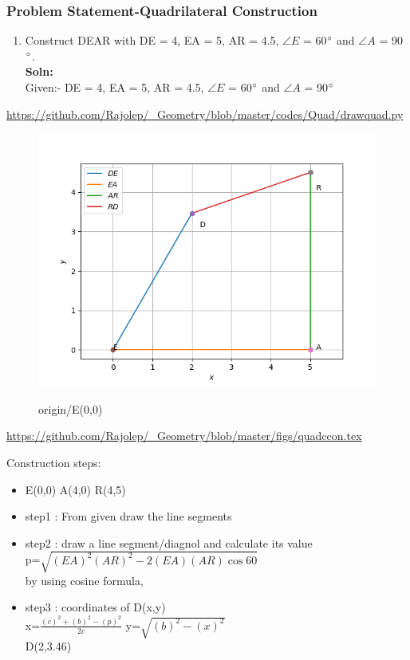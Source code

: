 \begin{frame}
\frametitle{Problem Statement-Quadrilateral Construction}
\begin{enumerate}[label=(\roman*)]
\item Construct DEAR with DE = 4, EA = 5, AR = 4.5, $\angle {E}$ = 60$\degree$ and $\angle {A}$ = 90$\degree$.\\
\textbf{Soln:}\\
Given:-  DE = 4, EA = 5, AR = 4.5, $\angle {E}$ = 60$\degree$ and $\angle {A}$ = 90$\degree$\\
  \end{enumerate}
\url{https://github.com/Rajolep/_Geometry/blob/master/codes/Quad/drawquad.py}
\begin{figure}
\includegraphics[scale=0.4]{./figs/quadcon.png}
\end{figure}
\end{frame}
\begin{frame}
\begin{figure}
origin/E(0,0)

\end{figure}
\url{https://github.com/Rajolep/_Geometry/blob/master/figs/quadccon.tex}
\end{frame}
\begin{frame}
Construction steps:
\begin{itemize}
\item E(0,0)  A(4,0) R(4,5)
\item step1 : From given draw the line segments
\item step2 : draw a line segment/diagnol and calculate its value \\
    p=$\sqrt{(EA)^2(AR)^2-2(EA)(AR)\cos{60}}$\\
     by using cosine formula,\\
 \item step3 : coordinates of D(x,y)   \\x=$\frac{(c)^2+(b)^2-(p)^2}{2c}$ y=$\sqrt{(b)^2-(x)^2}$   \\
     D(2,3.46)
     
\end{itemize}
\end{frame}
